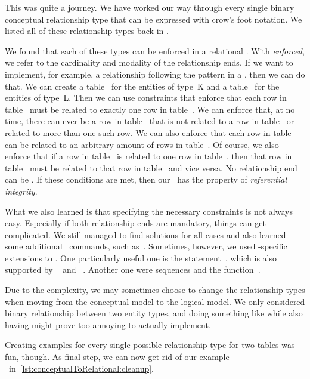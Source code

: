 %
%
%
%
%
%
This was quite a journey.
We have worked our way through every single binary conceptual relationship type that can be expressed with crow's foot notation.
We listed all of these relationship types back in .

We found that each of these types can be enforced in a relational \dbms.
With \emph{enforced}, we refer to the cardinality and modality of the relationship ends.
If we want to implement, for example, a relationship following the pattern  in a \dbms, then we can do that.
We can create a table~ for the entities of type~K and a table~ for the entities of type~L.
Then we can use constraints that enforce that each row in table~ must be related to exactly one row in table~.
We can enforce that, at no time, there can ever be a row in table~ that is not related to a row in table~ or related to more than one such row.
We can also enforce that each row in table~ can be related to an arbitrary amount of rows in table~.
Of course, we also enforce that if a row in table~ is related to one row in table~, then that row in table~ must be related to that row in table~ and vice versa.
No relationship end can be .
If these conditions are met, then our \db\ has the property of \emph{referential integrity}.

What we also learned is that specifying the necessary constraints is not always easy.
Especially if both relationship ends are mandatory, things can get complicated.
We still managed to find solutions for all cases and also learned some additional \sql\ commands, such as~.
Sometimes, however, we used \postgresql-specific extensions to \sql.
One particularly useful one is the  statement~\cite{PGDG:PD:RDFMR}, which is also supported by \mariadb~\cite{M:MSD:IR} and \sqlite~\cite{HWACIS:R}.
Another one were sequences and the  function~\cite{PGDG:PD:CS,PGDG:PD:SMF}.

Due to the complexity, we may sometimes choose to change the relationship types when moving from the conceptual model to the logical model.
We only considered binary relationship between two entity types, and doing something like  while also having  might prove too annoying to actually implement.

Creating examples for every single possible relationship type for two tables was fun, though.
As final step, we can now get rid of our example \db\ in~\cref{lst:conceptualToRelational:cleanup}.%
%
\endhsection%
